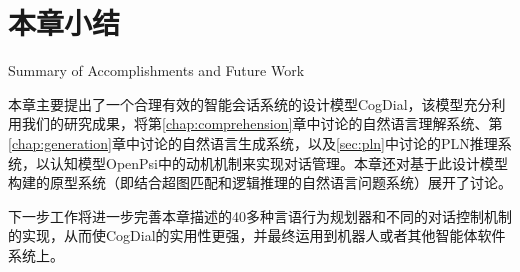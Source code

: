 \section{本章小结}{Summary of Accomplishments and Future Work}

本章主要提出了一个合理有效的智能会话系统的设计模型CogDial，该模型充分利用我们的研究成果，将第\ref{chap:comprehension}章中讨论的自然语言理解系统、第\ref{chap:generation}章中讨论的自然语言生成系统，以及\ref{sec:pln}中讨论的PLN推理系统，以认知模型OpenPsi中的动机机制来实现对话管理。本章还对基于此设计模型构建的原型系统（即结合超图匹配和逻辑推理的自然语言问题系统）展开了讨论。

下一步工作将进一步完善本章描述的40多种言语行为规划器和不同的对话控制机制的实现，从而使CogDial的实用性更强，并最终运用到机器人或者其他智能体软件系统上。
